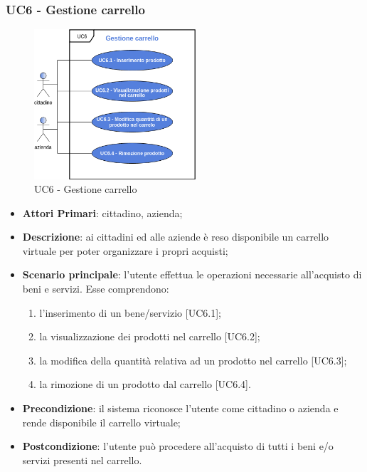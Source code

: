 \subsubsection{UC6 - Gestione carrello}
 \begin{figure}[h]
	\includegraphics[width=6cm]{res/images/UC6GestioneCarrello.png}
	\centering
	\caption{UC6 - Gestione carrello}
\end{figure}
\begin{itemize}
	\item \textbf{Attori Primari}: cittadino, azienda;
	\item \textbf{Descrizione}: ai cittadini ed alle aziende è reso disponibile un carrello virtuale per poter organizzare i propri acquisti;
	\item \textbf{Scenario principale}: l'utente effettua le operazioni necessarie all'acquisto di beni e servizi. Esse comprendono:
	\begin{enumerate}[label=\alph*.]
		\item l'inserimento di un bene/servizio [UC6.1];
		\item la visualizzazione dei prodotti nel carrello [UC6.2];
		\item la modifica della quantità relativa ad un prodotto nel carrello [UC6.3];
		\item la rimozione di un prodotto dal carrello [UC6.4].
	\end{enumerate}
	\item \textbf{Precondizione}: il sistema riconosce l'utente come cittadino o azienda e rende disponibile il carrello virtuale;
	\item \textbf{Postcondizione}: l'utente può procedere all'acquisto di tutti i beni e/o servizi presenti nel carrello.
\end{itemize} 
